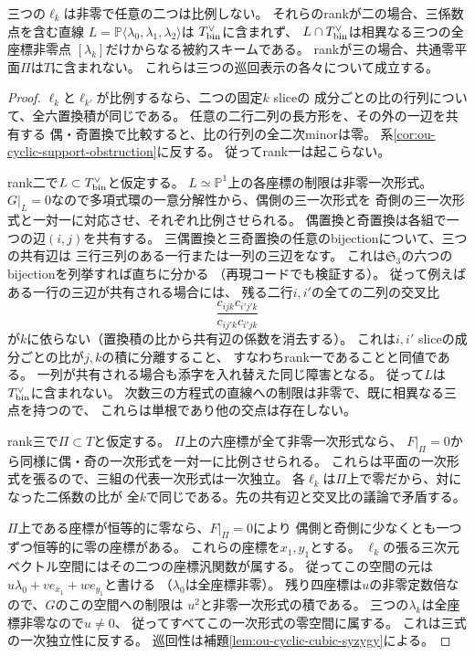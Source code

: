 \begin{lemma}[全係数非零の場合の行列式rank]
\label{lem:ou-dense-determinant-rank}
三つの$\ell_k$は非零で任意の二つは比例しない。
それらのrankが二の場合、三係数点を含む直線
$L=\mathbb P\langle\lambda_0,\lambda_1,\lambda_2\rangle$は
$T^\vee_{\rm bin}$に含まれず、
$L\cap T^\vee_{\rm bin}$は相異なる三つの全座標非零点
$[\lambda_k]$だけからなる被約スキームである。
rankが三の場合、共通零平面$\Pi$は$T$に含まれない。
これらは三つの巡回表示の各々について成立する。
\end{lemma}
\begin{proof}
$\ell_k$と$\ell_{k'}$が比例するなら、二つの固定$k$ sliceの
成分ごとの比の行列について、全六置換積が同じである。
任意の二行二列の長方形を、その外の一辺を共有する
偶・奇置換で比較すると、比の行列の全二次minorは零。
系\ref{cor:ou-cyclic-support-obstruction}に反する。
従ってrank一は起こらない。

rank二で$L\subset T^\vee_{\rm bin}$と仮定する。
$L\simeq\mathbb P^1$上の各座標の制限は非零一次形式。
$G|_L=0$なので多項式環の一意分解性から、偶側の三一次形式を
奇側の三一次形式と一対一に対応させ、それぞれ比例させられる。
偶置換と奇置換は各組で一つの辺$(i,j)$を共有する。
三偶置換と三奇置換の任意のbijectionについて、三つの共有辺は
三行三列のある一行または一列の三辺をなす。
これは$\mathfrak S_3$の六つのbijectionを列挙すれば直ちに分かる
（再現コードでも検証する）。
従って例えばある一行の三辺が共有される場合には、
残る二行$i,i'$の全ての二列の交叉比
\[
 \frac{c_{ijk}c_{i'j'k}}{c_{ij'k}c_{i'jk}}
\]
が$k$に依らない（置換積の比から共有辺の係数を消去する）。
これは$i,i'$ sliceの成分ごとの比が$j,k$の積に分離すること、
すなわちrank一であることと同値である。
一列が共有される場合も添字を入れ替えた同じ障害となる。
従って$L$は$T^\vee_{\rm bin}$に含まれない。
次数三の方程式の直線への制限は非零で、既に相異なる三点を持つので、
これらは単根であり他の交点は存在しない。

rank三で$\Pi\subset T$と仮定する。
$\Pi$上の六座標が全て非零一次形式なら、
$F|_\Pi=0$から同様に偶・奇の一次形式を一対一に比例させられる。
これらは平面の一次形式を張るので、三組の代表一次形式は一次独立。
各$\ell_k$は$\Pi$上で零だから、対になった二係数の比が
全$k$で同じである。先の共有辺と交叉比の議論で矛盾する。

$\Pi$上である座標が恒等的に零なら、$F|_\Pi=0$により
偶側と奇側に少なくとも一つずつ恒等的に零の座標がある。
これらの座標を$x_1,y_1$とする。
$\ell_k$の張る三次元ベクトル空間にはその二つの座標汎関数が属する。
従ってこの空間の元は$u\lambda_0+v e_{x_1}+w e_{y_1}$と書ける
（$\lambda_0$は全座標非零）。
残り四座標は$u$の非零定数倍なので、$G$のこの空間への制限は
$u^2$と非零一次形式の積である。
三つの$\lambda_k$は全座標非零なので$u\ne0$、
従ってすべてこの一次形式の零空間に属する。
これは三式の一次独立性に反する。
巡回性は補題\ref{lem:ou-cyclic-cubic-syzygy}による。
\end{proof}

